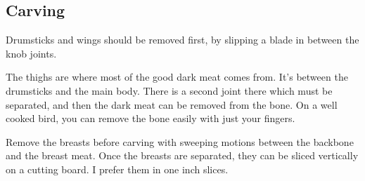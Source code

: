 \begin{recipe}
\subsection{Carving}

Drumsticks and wings should be removed first, by slipping a blade in between the knob joints.

The thighs are where most of the good dark meat comes from. It's between the drumsticks and the main body. There is a second joint there which must be separated, and then the dark meat can be removed from the bone. On a well cooked bird, you can remove the bone easily with just your fingers.

Remove the breasts before carving with sweeping motions between the backbone and the breast meat.
Once the breasts are separated, they can be sliced vertically on a cutting board.
I prefer them in one inch slices.

\end{recipe}
